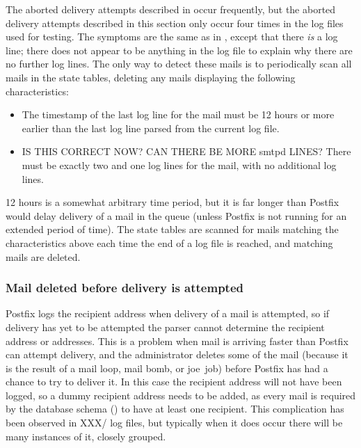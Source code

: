 \label{yet-more-aborted-delivery-attempts}

The aborted delivery attempts described in
 occur frequently, but the aborted
delivery attempts described in this section only occur four times in the
\numberOFlogFILES{} log files used for testing.  The symptoms are the same
as in , except that there
\textit{is\/} a  log line; there does not appear to be
anything in the log file to explain why there are no further log lines.
The only way to detect these mails is to periodically scan all mails in the
state tables, deleting any mails displaying the following characteristics:

\begin{itemize}

    \item The timestamp of the last log line for the mail must be 12 hours
        or more earlier than the last log line parsed from the current log
        file.

    \item IS THIS CORRECT NOW\@?  CAN THERE BE MORE smtpd LINES\@?  There
        must be exactly two  and one  log
        lines for the mail, with no additional log lines.

\end{itemize}

12 hours is a somewhat arbitrary time period, but it is far longer than
Postfix would delay delivery of a mail in the queue (unless Postfix is not
running for an extended period of time).  The state tables are scanned for
mails matching the characteristics above each time the end of a log file is
reached, and matching mails are deleted.

\subsubsection{Mail deleted before delivery is attempted}

\label{Mail deleted before delivery is attempted}

Postfix logs the recipient address when delivery of a mail is attempted, so
if delivery has yet to be attempted the parser cannot determine the
recipient address or addresses.  This is a problem when mail is arriving
faster than Postfix can attempt delivery, and the administrator deletes
some of the mail (because it is the result of a mail loop, mail bomb, or joe~job) before
Postfix has had a chance to try to deliver it.  In this case the recipient
address will not have been logged, so a dummy recipient address needs to be
added, as every mail is required by the database schema
() to have at least one recipient.  This
complication has been observed in XXX/\numberOFlogFILES{} log files, but
typically when it does occur there will be many instances of it, closely
grouped.


